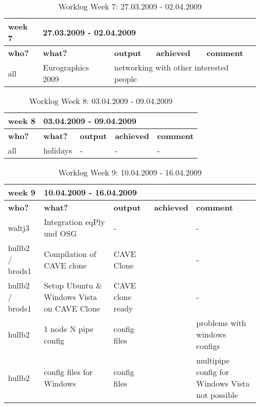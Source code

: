 \begin{table}[H]
	\centering
	\begin{tabular}{|b{}|p{}|p{}|p{}|p{}|}
		\hline \bfseries week 7 & \multicolumn{4}{l|}{\bfseries 27.03.2009 - 02.04.2009} \\
		\hline
		\hline \bfseries who? & \bfseries what? & \bfseries output & \bfseries achieved & \bfseries comment \\ 
		\hline all & Eurographics 2009 & \multicolumn{3}{l|}{networking with other interested people} \\
		\hline
	\end{tabular}
	\caption{Worklog Week 7: 27.03.2009 - 02.04.2009}
\end{table}

\begin{table}[H]
	\centering
	\begin{tabular}{|b{}|p{}|p{}|p{}|p{}|}
		\hline \bfseries week 8 & \multicolumn{4}{l|}{\bfseries 03.04.2009 - 09.04.2009} \\
		\hline
		\hline \bfseries who? & \bfseries what? & \bfseries output & \bfseries achieved & \bfseries comment \\ 
		\hline all & holidays & \quad\quad- & \quad\quad- & \quad\quad- \\
		\hline
	\end{tabular}
	\caption{Worklog Week 8: 03.04.2009 - 09.04.2009}
\end{table}

\begin{table}[H]
	\centering
	\begin{tabular}{|b{}|p{}|p{}|p{}|p{}|}
		\hline \bfseries week 9 & \multicolumn{4}{l|}{\bfseries 10.04.2009 - 16.04.2009} \\
		\hline
		\hline \bfseries who? & \bfseries what? & \bfseries output & \bfseries achieved & \bfseries comment \\ 
		\hline waltj3 & Integration eqPly und OSG & \quad\quad- & \tick & \quad\quad- \\
		\hline hullb2 / brods1 & Compilation of CAVE clone & CAVE Clone & \tick & \quad\quad- \\
		\hline hullb2 / brods1 & Setup Ubuntu \& Windows Vista on CAVE Clone & CAVE clone ready & \tick & \quad\quad- \\
		\hline hullb2 & 1 node N pipe config & config files & \tick & problems with windows configs \\
		\hline hullb2 & config files for Windows & config files & \cross & multipipe config for Windows Vista not possible \\
		\hline
	\end{tabular}
	\caption{Worklog Week 9: 10.04.2009 - 16.04.2009}
\end{table}

